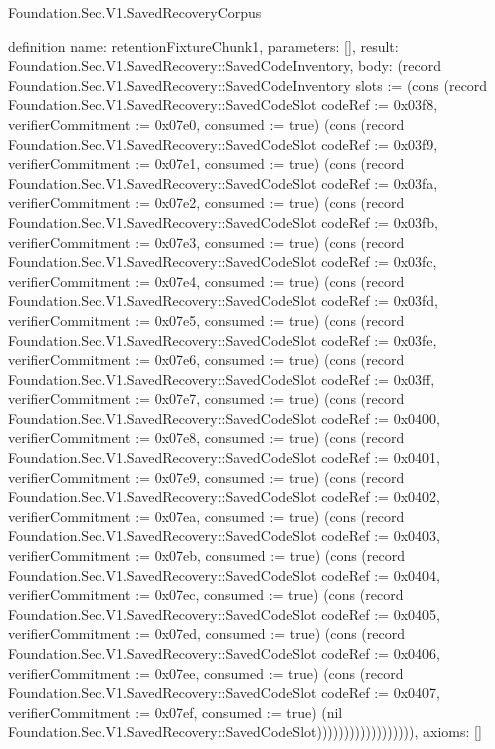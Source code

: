 \begin{lexlean}{Foundation.Sec.V1.SavedRecoveryCorpus}
\begin{semanticmodule}
definition{
  name: retentionFixtureChunk1,
  parameters: [],
  result: Foundation.Sec.V1.SavedRecovery::SavedCodeInventory,
  body: (record Foundation.Sec.V1.SavedRecovery::SavedCodeInventory {slots := (cons (record Foundation.Sec.V1.SavedRecovery::SavedCodeSlot {codeRef := 0x03f8, verifierCommitment := 0x07e0, consumed := true}) (cons (record Foundation.Sec.V1.SavedRecovery::SavedCodeSlot {codeRef := 0x03f9, verifierCommitment := 0x07e1, consumed := true}) (cons (record Foundation.Sec.V1.SavedRecovery::SavedCodeSlot {codeRef := 0x03fa, verifierCommitment := 0x07e2, consumed := true}) (cons (record Foundation.Sec.V1.SavedRecovery::SavedCodeSlot {codeRef := 0x03fb, verifierCommitment := 0x07e3, consumed := true}) (cons (record Foundation.Sec.V1.SavedRecovery::SavedCodeSlot {codeRef := 0x03fc, verifierCommitment := 0x07e4, consumed := true}) (cons (record Foundation.Sec.V1.SavedRecovery::SavedCodeSlot {codeRef := 0x03fd, verifierCommitment := 0x07e5, consumed := true}) (cons (record Foundation.Sec.V1.SavedRecovery::SavedCodeSlot {codeRef := 0x03fe, verifierCommitment := 0x07e6, consumed := true}) (cons (record Foundation.Sec.V1.SavedRecovery::SavedCodeSlot {codeRef := 0x03ff, verifierCommitment := 0x07e7, consumed := true}) (cons (record Foundation.Sec.V1.SavedRecovery::SavedCodeSlot {codeRef := 0x0400, verifierCommitment := 0x07e8, consumed := true}) (cons (record Foundation.Sec.V1.SavedRecovery::SavedCodeSlot {codeRef := 0x0401, verifierCommitment := 0x07e9, consumed := true}) (cons (record Foundation.Sec.V1.SavedRecovery::SavedCodeSlot {codeRef := 0x0402, verifierCommitment := 0x07ea, consumed := true}) (cons (record Foundation.Sec.V1.SavedRecovery::SavedCodeSlot {codeRef := 0x0403, verifierCommitment := 0x07eb, consumed := true}) (cons (record Foundation.Sec.V1.SavedRecovery::SavedCodeSlot {codeRef := 0x0404, verifierCommitment := 0x07ec, consumed := true}) (cons (record Foundation.Sec.V1.SavedRecovery::SavedCodeSlot {codeRef := 0x0405, verifierCommitment := 0x07ed, consumed := true}) (cons (record Foundation.Sec.V1.SavedRecovery::SavedCodeSlot {codeRef := 0x0406, verifierCommitment := 0x07ee, consumed := true}) (cons (record Foundation.Sec.V1.SavedRecovery::SavedCodeSlot {codeRef := 0x0407, verifierCommitment := 0x07ef, consumed := true}) (nil Foundation.Sec.V1.SavedRecovery::SavedCodeSlot)))))))))))))))))}),
  axioms: []
}


\end{semanticmodule}
\end{lexlean}
